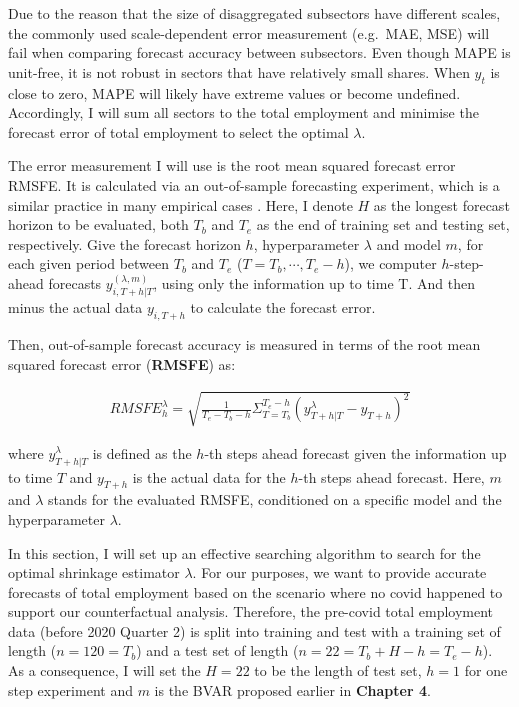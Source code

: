 \documentclass{monashthesis}
\begin{document}
Due to the reason that the size of disaggregated subsectors have different scales, the commonly used scale-dependent error measurement (e.g.~MAE, MSE) will fail when comparing forecast accuracy between subsectors. Even though MAPE is unit-free, it is not robust in sectors that have relatively small shares. When \(y_t\) is close to zero, MAPE will likely have extreme values or become undefined. Accordingly, I will sum all sectors to the total employment and minimise the forecast error of total employment to select the optimal \(\lambda\).

The error measurement I will use is the root mean squared forecast error RMSFE. It is calculated via an out-of-sample forecasting experiment, which is a similar practice in many empirical cases \autocite{banbura2010large,koop2013}. Here, I denote \(H\) as the longest forecast horizon to be evaluated, both \(T_{b}\) and \(T_{e}\) as the end of training set and testing set, respectively. Give the forecast horizon \(h\), hyperparameter \(\lambda\) and model \(m\), for each given period between \(T_{b}\) and \(T_{e}\) (\(T=T_b,\cdots,T_{e}-h\)), we computer \(h\)-step-ahead forecasts \({y}_{i,T+h|T}^{(\lambda,m)}\), using only the information up to time T. And then minus the actual data \(y_{i,T+h}\) to calculate the forecast error.

Then, out-of-sample forecast accuracy is measured in terms of the root mean squared forecast error (\textbf{RMSFE}) as:

\[
\begin{aligned}
RMSFE^{\lambda}_{h}=\sqrt{\frac{1}{T_e-T_b-h}\Sigma^{T_{e}-h}_{T=T_{b}}({y}_{T+h|T}^{\lambda}-y_{T+h})^2}
\end{aligned}
\]

where \({y}_{T+h|T}^{\lambda}\) is defined as the \(h\)-th steps ahead forecast given the information up to time \(T\) and \(y_{T+h}\) is the actual data for the \(h\)-th steps ahead forecast. Here, \(m\) and \(\lambda\) stands for the evaluated RMSFE, conditioned on a specific model and the hyperparameter \(\lambda\).

In this section, I will set up an effective searching algorithm to search for the optimal shrinkage estimator \(\lambda\). For our purposes, we want to provide accurate forecasts of total employment based on the scenario where no covid happened to support our counterfactual analysis. Therefore, the pre-covid total employment data (before 2020 Quarter 2) is split into training and test with a training set of length (\(n=120=T_b\)) and a test set of length (\(n=22=T_b+H-h=T_e-h\)). As a consequence, I will set the \(H=22\) to be the length of test set, \(h=1\) for one step experiment and \(m\) is the BVAR proposed earlier in \textbf{Chapter 4}.
\end{document}
